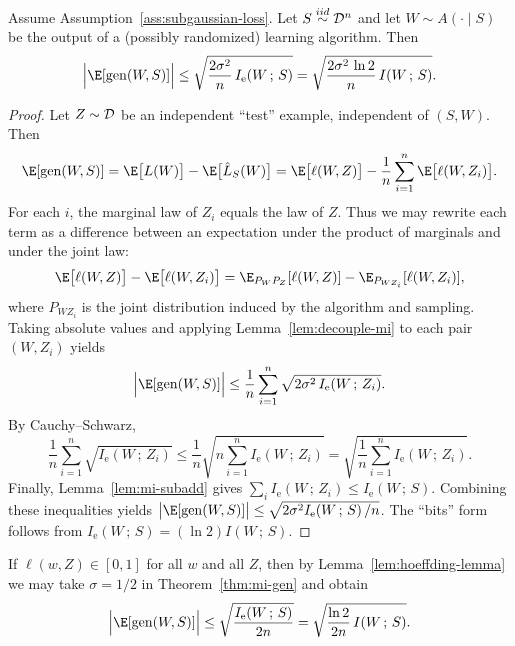 \documentclass{article}
\numberwithin{equation}{section}
\newcommand{\MI}[2]{I\!\left(#1\,;\,#2\right)}
\newcommand{\MInat}[2]{I_{\mathrm{e}}\!\left(#1\,;\,#2\right)}
\newcommand{\iid}{\stackrel{iid}{\sim}}
\newcommand{\cD}{{\cal D}}
\begin{document}
\begin{theorem}
\label{thm:mi-gen}
Assume Assumption~\ref{ass:subgaussian-loss}.
Let $S\iid \cD^n$ and let $W\sim A(\cdot\mid S)$ be the output of a (possibly randomized) learning algorithm.
Then
\begin{equation}
    \Big|\E[\mathrm{gen}(W,S)]\Big|
    \le \sqrt{\frac{2\sigma^2}{n}\,\MInat{W}{S}}
    = \sqrt{\frac{2\sigma^2\,\ln 2}{n}\,\MI{W}{S}}.
\end{equation}
\end{theorem}
\begin{proof}
Let $Z\sim\cD$ be an independent ``test'' example, independent of $(S,W)$.
Then
\begin{equation}
    \E[\mathrm{gen}(W,S)]
    = \E\big[L(W)\big] - \E\big[\hat L_S(W)\big]
    = \E\big[\ell(W,Z)\big] - \frac1n\sum_{i=1}^n \E\big[\ell(W,Z_i)\big].
\end{equation}
For each $i$, the marginal law of $Z_i$ equals the law of $Z$.
Thus we may rewrite each term as a difference between an expectation under the product of marginals and under the joint law:
\begin{equation}
\label{eq:gen-decompose}
    \E\big[\ell(W,Z)\big] - \E\big[\ell(W,Z_i)\big]
    = \E_{P_WP_Z}[\ell(W,Z)] - \E_{P_{WZ_i}}[\ell(W,Z_i)],
\end{equation}
where $P_{WZ_i}$ is the joint distribution induced by the algorithm and sampling.
Taking absolute values and applying Lemma~\ref{lem:decouple-mi} to each pair $(W,Z_i)$ yields
\begin{equation}
    \Big|\E[\mathrm{gen}(W,S)]\Big|
    \le \frac1n\sum_{i=1}^n \sqrt{2\sigma^2\,\MInat{W}{Z_i}}.
\end{equation}
By Cauchy--Schwarz,
\begin{equation}
    \frac1n\sum_{i=1}^n \sqrt{\MInat{W}{Z_i}}
    \le \frac1n\sqrt{n\sum_{i=1}^n \MInat{W}{Z_i}}
    = \sqrt{\frac{1}{n}\sum_{i=1}^n \MInat{W}{Z_i}}.
\end{equation}
Finally, Lemma~\ref{lem:mi-subadd} gives $\sum_i \MInat{W}{Z_i}\le \MInat{W}{S}$.
Combining these inequalities yields
\(\big|\E[\mathrm{gen}(W,S)]\big|\le \sqrt{2\sigma^2\MInat{W}{S}/n}\).
The ``bits'' form follows from $\MInat{W}{S}=(\ln 2)\MI{W}{S}$.
\end{proof}

\begin{corollary}
\label{cor:mi-gen-bounded}
If $\ell(w,Z)\in[0,1]$ for all $w$ and all $Z$, then by Lemma~\ref{lem:hoeffding-lemma} we may take $\sigma=1/2$ in Theorem~\ref{thm:mi-gen} and obtain
\begin{equation}
    \Big|\E[\mathrm{gen}(W,S)]\Big|
    \le \sqrt{\frac{\MInat{W}{S}}{2n}}
    = \sqrt{\frac{\ln 2}{2n}\,\MI{W}{S}}.
\end{equation}
\end{corollary}
\end{document}
